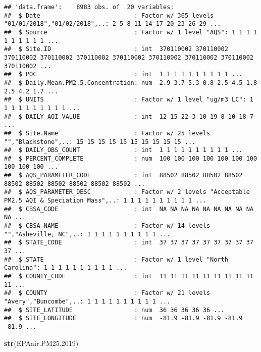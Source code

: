 \documentclass[]{article}
\newenvironment{Shaded}{\begin{snugshade}}{\end{snugshade}}
\newcommand{\FloatTok}[1]{\textcolor[rgb]{0.00,0.00,0.81}{#1}}
\newcommand{\KeywordTok}[1]{\textcolor[rgb]{0.13,0.29,0.53}{\textbf{#1}}}
\newcommand{\NormalTok}[1]{#1}
\begin{document}
\begin{verbatim}
## 'data.frame':    8983 obs. of  20 variables:
##  $ Date                          : Factor w/ 365 levels "01/01/2018","01/02/2018",..: 2 5 8 11 14 17 20 23 26 29 ...
##  $ Source                        : Factor w/ 1 level "AQS": 1 1 1 1 1 1 1 1 1 1 ...
##  $ Site.ID                       : int  370110002 370110002 370110002 370110002 370110002 370110002 370110002 370110002 370110002 370110002 ...
##  $ POC                           : int  1 1 1 1 1 1 1 1 1 1 ...
##  $ Daily.Mean.PM2.5.Concentration: num  2.9 3.7 5.3 0.8 2.5 4.5 1.8 2.5 4.2 1.7 ...
##  $ UNITS                         : Factor w/ 1 level "ug/m3 LC": 1 1 1 1 1 1 1 1 1 1 ...
##  $ DAILY_AQI_VALUE               : int  12 15 22 3 10 19 8 10 18 7 ...
##  $ Site.Name                     : Factor w/ 25 levels "","Blackstone",..: 15 15 15 15 15 15 15 15 15 15 ...
##  $ DAILY_OBS_COUNT               : int  1 1 1 1 1 1 1 1 1 1 ...
##  $ PERCENT_COMPLETE              : num  100 100 100 100 100 100 100 100 100 100 ...
##  $ AQS_PARAMETER_CODE            : int  88502 88502 88502 88502 88502 88502 88502 88502 88502 88502 ...
##  $ AQS_PARAMETER_DESC            : Factor w/ 2 levels "Acceptable PM2.5 AQI & Speciation Mass",..: 1 1 1 1 1 1 1 1 1 1 ...
##  $ CBSA_CODE                     : int  NA NA NA NA NA NA NA NA NA NA ...
##  $ CBSA_NAME                     : Factor w/ 14 levels "","Asheville, NC",..: 1 1 1 1 1 1 1 1 1 1 ...
##  $ STATE_CODE                    : int  37 37 37 37 37 37 37 37 37 37 ...
##  $ STATE                         : Factor w/ 1 level "North Carolina": 1 1 1 1 1 1 1 1 1 1 ...
##  $ COUNTY_CODE                   : int  11 11 11 11 11 11 11 11 11 11 ...
##  $ COUNTY                        : Factor w/ 21 levels "Avery","Buncombe",..: 1 1 1 1 1 1 1 1 1 1 ...
##  $ SITE_LATITUDE                 : num  36 36 36 36 36 ...
##  $ SITE_LONGITUDE                : num  -81.9 -81.9 -81.9 -81.9 -81.9 ...
\end{verbatim}

\begin{Shaded}
\begin{Highlighting}[]
\KeywordTok{str}\NormalTok{(EPAair.PM25}\FloatTok{.2019}\NormalTok{)}
\end{Highlighting}
\end{Shaded}
\end{document}
